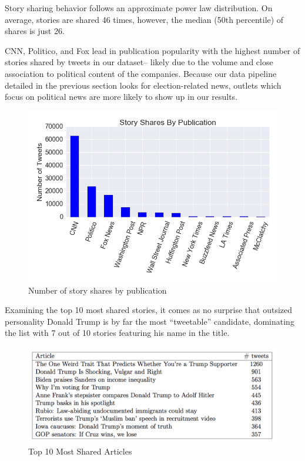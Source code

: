 \documentclass[letterpaper]{article}
\begin{document}
Story sharing behavior follows an approximate power law distribution. On average, stories are shared 46 times, however, the median (50th percentile) of shares is just 26. 


CNN, Politico, and Fox lead in publication popularity with the highest number of stories shared by tweets in our dataset-- likely due to the volume and close association to political content of the companies. Because our data pipeline detailed in the previous section looks for election-related news, outlets which focus on political news are more likely to show up in our results.


\begin{figure}[t!]  
\centering 
  \includegraphics[width=\columnwidth]{all-stories-by-pub}  
  \caption{Number of story shares by publication
    \label{fig:tweets-by-pub}}
\end{figure} 



Examining the top 10 most shared stories, it comes as no surprise that outsized personality Donald Trump is by far the most ``tweetable'' candidate, dominating the list with 7 out of 10 stories featuring his name in the title.

 
\begin{figure}[t!]  
\centering 
  \includegraphics[width=\columnwidth]{top-10-stories}  
  \caption{Top 10 Most Shared Articles
    \label{fig:top-10-stories}}
\end{figure} 
\end{document}
